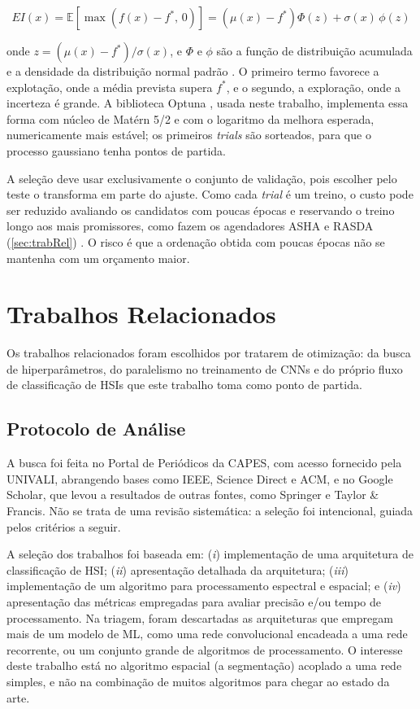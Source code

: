 \begin{equation}
EI(x) = \mathbb{E}\left[\max\left(f(x) - f^{*},\, 0\right)\right] = \left(\mu(x) - f^{*}\right)\Phi(z) + \sigma(x)\,\phi(z)
\end{equation}

\noindent onde $z = (\mu(x) - f^{*})/\sigma(x)$, e $\Phi$ e $\phi$ são a função de distribuição acumulada e a densidade da distribuição normal padrão \cite{WU201926}. O primeiro termo favorece a explotação, onde a média prevista supera $f^{*}$, e o segundo, a exploração, onde a incerteza é grande. A biblioteca Optuna \cite{Akiba2019Optuna}, usada neste trabalho, implementa essa forma com núcleo de Matérn 5/2 e com o logaritmo da melhora esperada, numericamente mais estável; os primeiros \textit{trials} são sorteados, para que o processo gaussiano tenha pontos de partida.

A seleção deve usar exclusivamente o conjunto de validação, pois escolher pelo teste o transforma em parte do ajuste. Como cada \textit{trial} é um treino, o custo pode ser reduzido avaliando os candidatos com poucas épocas e reservando o treino longo aos mais promissores, como fazem os agendadores ASHA e RASDA (\autoref{sec:trabRel}) \cite{Aach2025}. O risco é que a ordenação obtida com poucas épocas não se mantenha com um orçamento maior.

\section{Trabalhos Relacionados}
\label{sec:trabRel}

Os trabalhos relacionados foram escolhidos por tratarem de otimização: da busca de hiperparâmetros, do paralelismo no treinamento de CNNs e do próprio fluxo de classificação de HSIs que este trabalho toma como ponto de partida.

\subsection{Protocolo de Análise}

A busca foi feita no Portal de Periódicos da CAPES, com acesso fornecido pela UNIVALI, abrangendo bases como IEEE, Science Direct e ACM, e no Google Scholar, que levou a resultados de outras fontes, como Springer e Taylor \& Francis. Não se trata de uma revisão sistemática: a seleção foi intencional, guiada pelos critérios a seguir.

A seleção dos trabalhos foi baseada em:
(\textit{i}) implementação de uma arquitetura de classificação de HSI;
(\textit{ii}) apresentação detalhada da arquitetura;
(\textit{iii}) implementação de um algoritmo para processamento espectral e espacial; e
(\textit{iv}) apresentação das métricas empregadas para avaliar precisão e/ou tempo de processamento.
Na triagem, foram descartadas as arquiteturas que empregam mais de um modelo de ML, como uma rede convolucional encadeada a uma rede recorrente, ou um conjunto grande de algoritmos de processamento. O interesse deste trabalho está no algoritmo espacial (a segmentação) acoplado a uma rede simples, e não na combinação de muitos algoritmos para chegar ao estado da arte.

